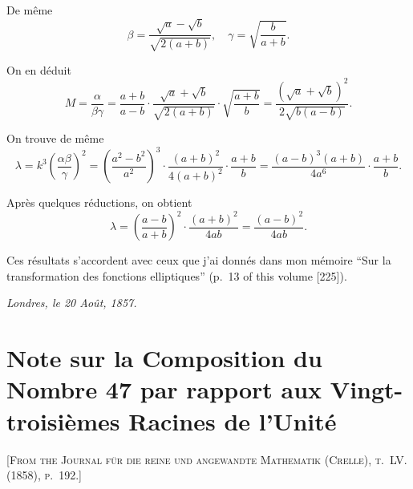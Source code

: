 \documentclass[11pt,a4paper]{article}
\begin{document}
De même
\[
\beta = \frac{\sqrt{a}-\sqrt{b}}{\sqrt{2(a+b)}}, \quad
\gamma = \sqrt{\frac{b}{a+b}}.
\]

On en déduit
\[
M = \frac{\alpha}{\beta\gamma} = \frac{a+b}{a-b} \cdot \frac{\sqrt{a}+\sqrt{b}}{\sqrt{2(a+b)}} \cdot \sqrt{\frac{a+b}{b}}
= \frac{(\sqrt{a}+\sqrt{b})^2}{2\sqrt{b(a-b)}}.
\]

\setcounter{page}{70}

On trouve de même
\[
\lambda = k^3 \left(\frac{\alpha\beta}{\gamma}\right)^2
= \left(\frac{a^2-b^2}{a^2}\right)^{\!3} \cdot \frac{(a+b)^2}{4(a+b)^2} \cdot \frac{a+b}{b}
= \frac{(a-b)^3(a+b)}{4a^6} \cdot \frac{a+b}{b}.
\]

Après quelques réductions, on obtient
\[
\lambda = \left(\frac{a-b}{a+b}\right)^2 \cdot \frac{(a+b)^2}{4ab}
= \frac{(a-b)^2}{4ab}.
\]

Ces résultats s'accordent avec ceux que j'ai donnés dans mon mémoire ``Sur la transformation des fonctions elliptiques'' (p.~13 of this volume [225]).

\medskip
\noindent\textit{Londres, le 20 Août, 1857.}

\newpage



\section{Note sur la Composition du Nombre 47 par rapport aux Vingt-troisièmes Racines de l'Unité}

\textsc{[From the Journal für die reine und angewandte Mathematik (Crelle), t.~LV. (1858), p.~192.]}
\label{paper:236}

\setcounter{page}{71}
\end{document}
